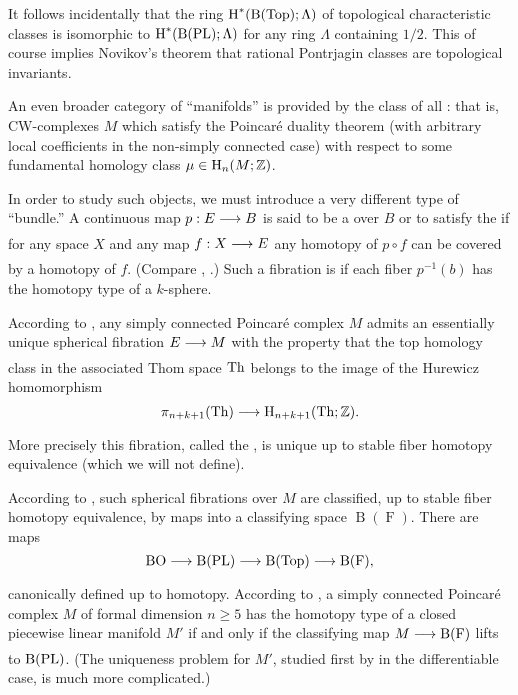 \documentclass[../main]{subfiles}
\begin{document}
It follows incidentally that the ring $\operatorname{H}^\ast(\operatorname{B}(\operatorname{Top});\Lambda)$ of topological characteristic classes is isomorphic to $\operatorname{H}^\ast(\operatorname{B}(\operatorname{PL});\Lambda)$ for any ring $\Lambda$ containing $1/2$. This of course implies Novikov's theorem that rational Pontrjagin classes are topological invariants.

An even broader category of  ``manifolds'' is provided by the class of all : that is, CW-complexes $M$ which satisfy the Poincaré duality theorem (with arbitrary local coefficients in the non-simply connected case) with respect to some fundamental homology class $\mu \in \operatorname{H}_n(M;\mathbb{Z})$.

In order to study such objects, we must introduce a very different type of ``bundle.'' A continuous map $p:E \varrightarrow{} B$ is said to be a  over $B$ or to satisfy the  if for any space $X$ and any map $f:X \varrightarrow{} E$ any homotopy of $p \circ f$ can be covered by a homotopy of $f$. (Compare \cite{hurewicz}, \cite{dold1963}.) Such a fibration is  if each fiber $p^{-1}(b)$ has the homotopy type of a $k$-sphere.

According to \cite{spivak}, any simply connected Poincaré complex $M$ admits an essentially unique spherical fibration $E \varrightarrow{} M$ with the property that the top homology class in the associated Thom space $\operatorname{Th}$ belongs to the image of the Hurewicz homomorphism \[\pi_{n+k+1}(\thom) \varrightarrow{} \homology_{n+k+1}(\thom;\mathbb{Z}).\] More precisely this fibration, called the , is unique up to stable fiber homotopy equivalence (which we will not define). 

According to \cite{stasheff1963}, such spherical fibrations over $M$ are classified, up to stable fiber homotopy equivalence, by maps into a classifying space $\operatorname{B}(\operatorname{F})$. There are maps \[\BO \varrightarrow{} \operatorname{B}(\PL) \varrightarrow{} \operatorname{B}(\operatorname{Top}) \varrightarrow{} \operatorname{B}(\operatorname{F}),\]
canonically defined up to homotopy. According to \cite{Browder1968SurgeryAT}, a simply connected Poincaré complex $M$ of formal dimension $n \geq 5$ has the homotopy type of a closed piecewise linear manifold  $M'$ if and only if the classifying map $M \varrightarrow{} \operatorname{B}(\operatorname{F})$ lifts to $\operatorname{B}(\operatorname{PL})$. (The uniqueness problem for $M'$, studied first by \cite{Novikov_1967} in the differentiable case, is much more complicated.)
\end{document}
